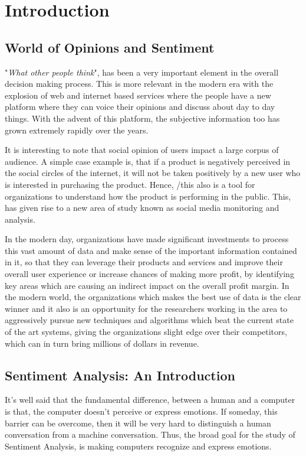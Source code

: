 \chapter{Introduction}\label{chapter:introduction}


\section{World of Opinions and Sentiment}
"\textit{What other people think}", has been a very important element in the overall decision making process. This is more relevant in the modern era with the explosion of web and internet based services where the people have a new platform where they can voice their opinions and discuss about day to day things. With the advent of this platform, the subjective information too has grown extremely rapidly over the years.  
\newline

It is interesting to note that social opinion of users impact a large corpus of audience. A simple case example is, that if a product is negatively perceived in the social circles of the internet, it will not be taken positively by a new user who is interested in purchasing the product. Hence, /this also is a tool for organizations to understand how the product is performing in the public. This, has given rise to a new area of study known as social media monitoring and analysis. 
\newline

In the modern day, organizations have made significant investments to process this vast amount of data and make sense of the important information contained in it, so that they can leverage their products and services and improve their overall user experience or increase chances of making more profit, by identifying key areas which are causing an indirect impact on the overall profit margin. In the modern world, the organizations which makes the best use of data is the clear winner and it also is an opportunity for the researchers working in the area to aggressively pursue new techniques and algorithms which beat the current state of the art systems, giving the organizations slight edge over their competitors, which can in turn bring millions of dollars in revenue.      
\section{Sentiment Analysis: An Introduction}
It's well said that the fundamental difference, between a human and a computer is that, the computer doesn't perceive or express emotions. If someday, this barrier can be overcome, then it will be very hard to distinguish a human conversation  from a machine conversation. Thus, the broad goal for the study of Sentiment Analysis, is making computers recognize and express emotions.  

